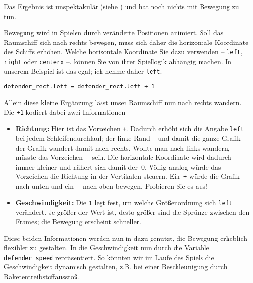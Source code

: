 
Das Ergebnis ist unspektakulär (siehe ) und hat noch nichts mit Bewegung zu tun.

Bewegung wird in Spielen durch veränderte Positionen animiert. Soll das Raumschiff sich nach rechts bewegen, muss sich daher die horizontale Koordinate des Schiffs erhöhen. Welche horizontale Koordinate Sie dazu verwenden -- \texttt{left}, \texttt{right} oder \texttt{centerx} --, können Sie von ihrer Spiellogik abhängig machen. In unserem Beispiel ist das egal; ich nehme daher \texttt{left}.

\lstset{firstnumber=36}
\begin{lstlisting}
defender_rect.left = defender_rect.left + 1
\end{lstlisting}

Allein diese kleine Ergänzung lässt unser Raumschiff nun nach rechts wandern. Die \texttt{+1} kodiert dabei zwei Informationen: 
\begin{itemize}
	\item \textbf{Richtung:} Hier ist das Vorzeichen \texttt{+}. Dadurch erhöht sich die Angabe \texttt{left} bei jedem Schleifendurchlauf; der linke Rand -- und damit die ganze Grafik -- der Grafik wandert damit nach rechts. Wollte man nach links wandern, müsste das Vorzeichen~\texttt{-} sein. Die horizontale Koordinate wird dadurch immer kleiner und nähert sich damit der~0. Völlig analog würde das Vorzeichen die Richtung in der Vertikalen steuern. Ein~\texttt{+} würde die Grafik nach unten und ein~\texttt{-} nach oben bewegen. Probieren Sie es aus!
	
	\item \textbf{Geschwindigkeit:} Die \texttt{1} legt fest, um welche Größenordnung sich \texttt{left} verändert. Je größer der Wert ist, desto größer sind die Sprünge zwischen den Frames; die Bewegung erscheint schneller. 
\end{itemize}


Diese beiden Informationen werden nun in  dazu genutzt, die Bewegung erheblich flexibler zu gestalten. In  die Geschwindigkeit nun durch die Variable \texttt{defender\_speed} repräsentiert. So könnten wir im Laufe des Spiels die Geschwindigkeit dynamisch gestalten, z.B. bei einer Beschleunigung durch Raketentreibstoffausstoß. 

